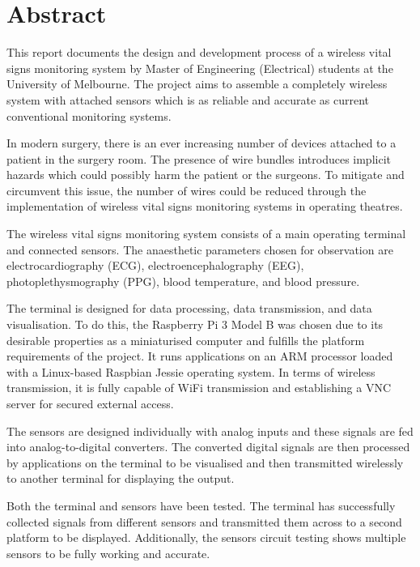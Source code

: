 
\chapter*{Abstract}

This report documents the design and development process of a wireless vital signs monitoring system by Master of Engineering (Electrical) students at the University of Melbourne. The project aims to assemble a completely wireless system with attached sensors which is as reliable and accurate as current conventional monitoring systems.  

In modern surgery, there is an ever increasing number of devices attached to a patient in the surgery room. The presence of wire bundles introduces implicit hazards which could possibly harm the patient or the surgeons. To mitigate and circumvent this issue, the number of wires could be reduced through the implementation of wireless vital signs monitoring systems in operating theatres.  

The wireless vital signs monitoring system consists of a main operating terminal and connected sensors. The anaesthetic parameters chosen for observation are electrocardiography (ECG), electroencephalography (EEG), photoplethysmography (PPG), blood temperature, and blood pressure. 

The terminal is designed for data processing, data transmission, and data visualisation. To do this, the Raspberry Pi 3 Model B was chosen due to its desirable properties as a miniaturised computer and fulfills the platform requirements of the project. It runs applications on an ARM processor loaded with a Linux-based Raspbian Jessie operating system. In terms of wireless transmission, it is fully capable of WiFi transmission and establishing a VNC server for secured external access. 

The sensors are designed individually with analog inputs and these signals are fed into analog-to-digital converters. The converted digital signals are then processed by applications on the terminal to be visualised and then transmitted wirelessly to another terminal for displaying the output. 

Both the terminal and sensors have been tested. The terminal has successfully collected signals from different sensors and transmitted them across to a second platform to be displayed. Additionally, the sensors circuit testing shows multiple sensors to be fully working and accurate. 


